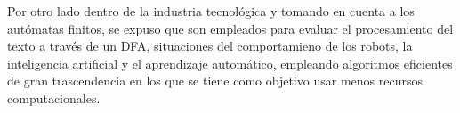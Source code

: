 \documentclass[10pt,conference]{IEEEtran}
\begin{document}
    Por otro lado dentro de la industria tecnológica y tomando en cuenta a los autómatas finitos, se expuso que son empleados para evaluar el procesamiento del texto a través de un DFA, situaciones del comportamieno de los robots, la inteligencia artificial y el aprendizaje automático, empleando algoritmos eficientes de gran trascendencia en los que se tiene como objetivo usar menos recursos computacionales.



\end{document}
